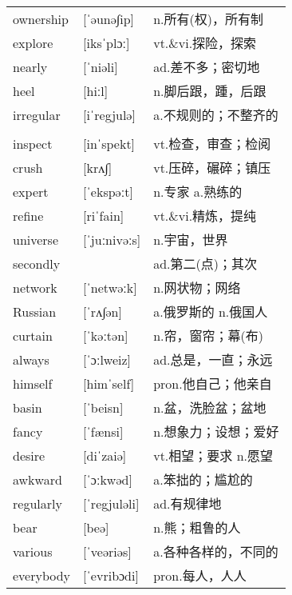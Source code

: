 \documentclass[a4paper]{article}
\begin{document}
\section{}
\begin{tabular}{l l l}

ownership & [ˈəunə∫ip] & n.所有(权)，所有制 \\
explore & [iksˈplɔː] & vt.\&vi.探险，探索 \\
nearly & [ˈniəli] & ad.差不多；密切地 \\
heel & [hiːl] & n.脚后跟，踵，后跟 \\
irregular & [iˈregjulə] & a.不规则的；不整齐的 \\
 &  &  \\
inspect & [inˈspekt] & vt.检查，审查；检阅 \\
crush & [krʌ∫] & vt.压碎，碾碎；镇压 \\
expert & [ˈekspəːt] & n.专家 a.熟练的 \\
refine & [riˈfain] & vt.\&vi.精炼，提纯 \\
universe & [ˈjuːnivəːs] & n.宇宙，世界 \\
secondly &  & ad.第二(点)；其次 \\
network & [ˈnetwəːk] & n.网状物；网络 \\
Russian & [ˈrʌ∫ən] & a.俄罗斯的 n.俄国人 \\
curtain & [ˈkəːtən] & n.帘，窗帘；幕(布) \\
always & [ˈɔːlweiz] & ad.总是，一直；永远 \\
himself & [himˈself] & pron.他自己；他亲自 \\
basin & [ˈbeisn] & n.盆，洗脸盆；盆地 \\
fancy & [ˈfænsi] & n.想象力；设想；爱好 \\
desire & [diˈzaiə] & vt.相望；要求 n.愿望 \\
awkward & [ˈɔːkwəd] & a.笨拙的；尴尬的 \\
regularly & [ˈregjuləli] & ad.有规律地 \\
bear & [beə] & n.熊；粗鲁的人 \\
various & [ˈveəriəs] & a.各种各样的，不同的 \\
everybody & [ˈevribɔdi] & pron.每人，人人 \\

\end{tabular}
\end{document}
